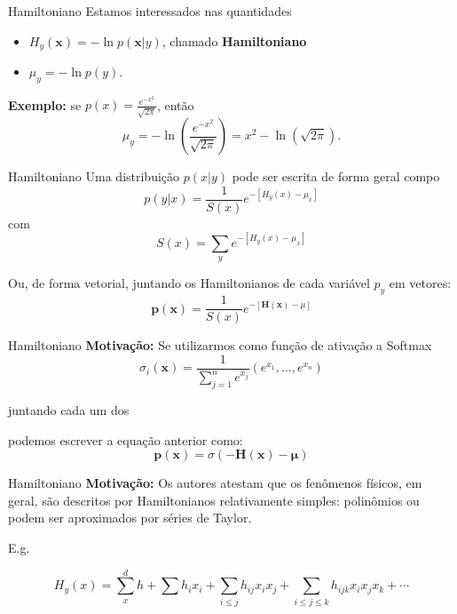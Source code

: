 \documentclass{beamer}
\begin{document}
\begin{frame}{Hamiltoniano}
    Estamos interessados nas quantidades
    \begin{itemize}
        \item $H_y(\mathbf x) = -\ln p(\mathbf x | y)$, chamado \textbf{Hamiltoniano}
        \item $\mu_y = -\ln p(y)$. 
    \end{itemize}

    
    \textbf{Exemplo:} se $p(x) = \frac{e^{-x^2}}{\sqrt{2\pi}}$, então
    \[
        \mu_y = - \ln \left(\frac{e^{-x^2}}{\sqrt{2\pi}}\right) = x^2 - \ln(\sqrt{2\pi}).
    \]
\end{frame}

\begin{frame}{Hamiltoniano}
    Uma distribuição $p(x|y)$ pode ser escrita de forma geral compo
    \[
    p(y|x) = \frac{1}{S(x)}e^{-[H_y(x) - \mu_x]}
    \]
    com
    \[
    S(x) = \sum_y e^{-[H_y(x) - \mu_x]}
    \]

    \pause

    Ou, de forma vetorial, juntando os Hamiltonianos de cada variável $p_y$ em vetores:
    \[
        \mathbf{p(x)} = \frac{1}{S(x)}e^{-[\mathbf H(\mathbf x) - \mu]}
    \]
\end{frame}

\begin{frame}{Hamiltoniano}
    \textbf{Motivação:} Se utilizarmos como função de ativação a Softmax
    \[
        \sigma_i(\mathbf x) = \frac{1}{\sum_{j=1}^n e^{x_j}}(e^{x_1}, \dots, e^{x_n})
    \]

    juntando cada um dos 

    podemos escrever a equação anterior como:
    \[
    \mathbf{p(x)} = \sigma (-\mathbf H(\mathbf x) - \mathbf \mu)
    \]
\end{frame}


\begin{frame}{Hamiltoniano}
    \textbf{Motivação:} Os autores atestam que os fenômenos físicos, em geral, são descritos por Hamiltonianos relativamente simples: \pause polinômios ou podem ser aproximados por séries de Taylor.

    \pause

    E.g.

    \[
        H_y(x) = \sum^d_{x} h + \sum h_i x_i + \sum_{i \leq j} h_{ij} x_i x_j + \sum_{i \leq j \leq k} h_{ijk} x_i x_j x_k + \cdots
    \]

\end{frame}
\end{document}
